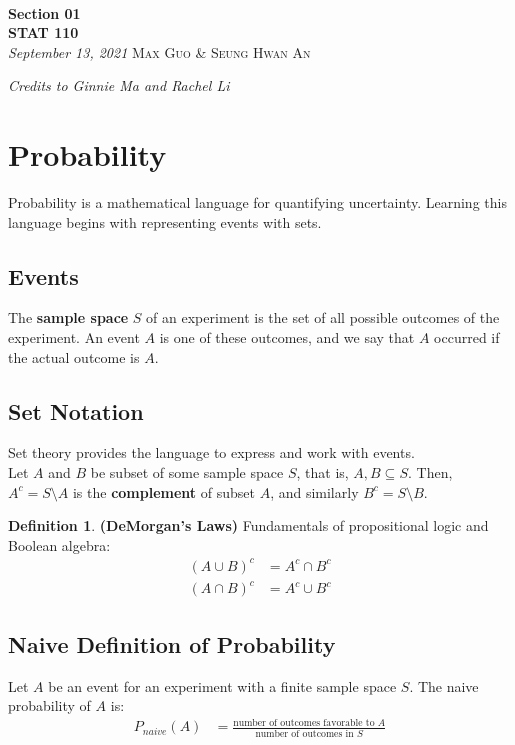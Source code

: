 \documentclass[10pt]{article}
\theoremstyle{definition}
\newtheorem{defin}[theo]{\color{Maroon} Definition}
\theoremstyle{remark}
\newcommand{\inserttitle}{Section 01}
\newcommand{\insertauthor}{Max Guo \& Seung Hwan An}
\newcommand{\insertcourse}{STAT 110}
\begin{document}
{\noindent\Huge\bf  \\[0.1\baselineskip] {\inserttitle }}\\[2\baselineskip]
{{\bf \insertcourse}\\ {\textit{September 13, 2021}}} \hfill {\large \textsc{\insertauthor}}
\smallskip

\hfill \noindent \textit{Credits to Ginnie Ma and Rachel Li}

\section{Probability}

Probability is a mathematical language for quantifying uncertainty. Learning this language begins with representing events with sets.

\subsection{Events}

The \textbf{sample space} $S$ of an experiment is the set of all possible outcomes of the experiment. An event $A$ is one of these outcomes, and we say that $A$ occurred if the actual outcome is $A$.

\subsection{Set Notation}

Set theory provides the language to express and work with events.\\

\noindent
Let $A$ and $B$ be subset of some sample space $S$, that is, $A,B \subseteq S$. Then, $A^c = S \setminus A$ is the \textbf{complement} of subset $A$, and similarly $B^c = S \setminus B$.

\begin{defin} \textbf{(DeMorgan's Laws)} Fundamentals of propositional logic and Boolean algebra:
\begin{align*}
    (A\cup B)^c &= A^c \cap B^c \\
    (A\cap B)^c &= A^c \cup B^c
\end{align*}
\end{defin}

\subsection{Naive Definition of Probability}
Let $A$ be an event for an experiment with a finite sample space $S$. The naive probability of $A$ is:
\begin{align*}
    P_{naive}(A) &= \frac{\text{number of outcomes favorable to $A$}}{\text{number of outcomes in $S$}}
\end{align*}
\end{document}
